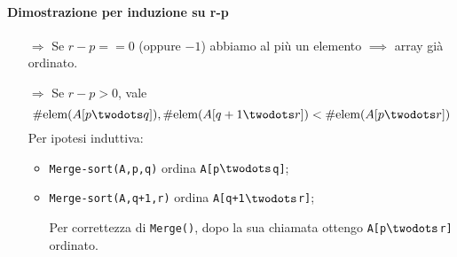 \paragraph{Dimostrazione per induzione su r-p} 
\begin{itemize}
    \item[$\Rightarrow$] Se $r-p == 0 $ (oppure $-1$) abbiamo al
    più un elemento $\implies$ array già ordinato.
    \item[$\Rightarrow$] Se $r-p > 0$, vale 
    $$\#\text{elem}(A[p \twodots q]),\#\text{elem}(A[q+1 \twodots r]) 
    < \#\text{elem}(A[p \twodots r])$$
    Per ipotesi induttiva:
    \begin{itemize}
        \item \texttt{Merge-sort(A,p,q)} ordina \texttt{A[p$\twodots$q]};
        \item \texttt{Merge-sort(A,q+1,r)} ordina \texttt{A[q+1$\twodots$r]}; \par
        Per correttezza di \texttt{Merge()}, dopo la sua chiamata ottengo 
        \texttt{A[p$\twodots$r]} ordinato.
    \end{itemize}
\end{itemize} 